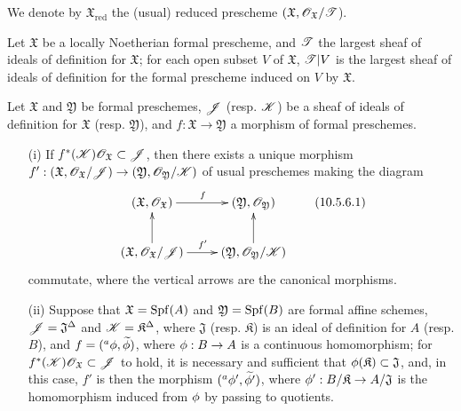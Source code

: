 We denote by $\mathfrak{X}_\text{red}$ the (usual) reduced prescheme $(\mathfrak{X},\mathscr{O}_\mathfrak{X}/\mathscr{T}$).

\begin{corollary}[10.5.5]
\label{1.10.5.5}
Let $\mathfrak{X}$ be a locally Noetherian formal prescheme, and $\mathscr{T}$ the largest sheaf of ideals of definition for $\mathfrak{X}$; for each open subset $V$ of $\mathfrak{X}$, $\mathscr{T}|V$ is the largest sheaf of ideals of definition for the formal prescheme induced on $V$ by $\mathfrak{X}$.
\end{corollary}

\begin{proposition}[10.5.6]
\label{1.10.5.6}
Let $\mathfrak{X}$ and $\mathfrak{Y}$ be formal preschemes, $\mathscr{J}$ (resp. $\mathscr{K}$) be a sheaf of ideals of definition for $\mathfrak{X}$ (resp. $\mathfrak{Y}$), and $f:\mathfrak{X}\to\mathfrak{Y}$ a morphism of formal preschemes.
\begin{enumerate}
  \item[\rm{(i)}] If $f^*(\mathscr{K})\mathscr{O}_\mathfrak{X}\subset\mathscr{J}$, then there exists a unique morphism $f':(\mathfrak{X},\sh{O}_\mathfrak{X}/\sh{J})\to(\mathfrak{Y},\sh{O}_\mathfrak{Y}/\sh{K})$ of usual preschemes making the diagram
    \[
    \label{1.10.5.6.1}
      \xymatrix{
        (\mathfrak{X},\sh{O}_\mathfrak{X})\ar[r]^f &
        (\mathfrak{Y},\sh{O}_\mathfrak{Y})\\
        (\mathfrak{X},\sh{O}_\mathfrak{X}/\sh{J})\ar[r]^{f'}\ar[u] &
        (\mathfrak{Y},\sh{O}_\mathfrak{Y}/\sh{K})\ar[u]
      }
      \tag{10.5.6.1}
    \]
    commutate, where the vertical arrows are the canonical morphisms.
  \item[\rm{(ii)}] Suppose that $\mathfrak{X}=\operatorname{Spf}(A)$ and $\mathfrak{Y}=\operatorname{Spf}(B)$ are formal affine schemes, $\mathscr{J}=\mathfrak{J}^\Delta$ and $\mathscr{K}=\mathfrak{K}^\Delta$, where $\mathfrak{J}$ (resp. $\mathfrak{K}$) is an ideal of definition for $A$ (resp. $B$), and $f=({}^a\phi,\widetilde{\phi})$, where $\vphi:B\to A$ is a continuous homomorphism;
    for $f^*(\mathscr{K})\mathscr{O}_\mathfrak{X}\subset\mathscr{J}$ to hold, it is necessary and sufficient that $\phi(\mathfrak{K})\subset\mathfrak{J}$, and, in this case, $f'$ is then the morphism $({}^a\phi',\widetilde{\phi'})$, where $\vphi':B/\mathfrak{K}\to A/\mathfrak{J}$ is the homomorphism induced from $\phi$ by passing to quotients.
\end{enumerate}
\end{proposition}

